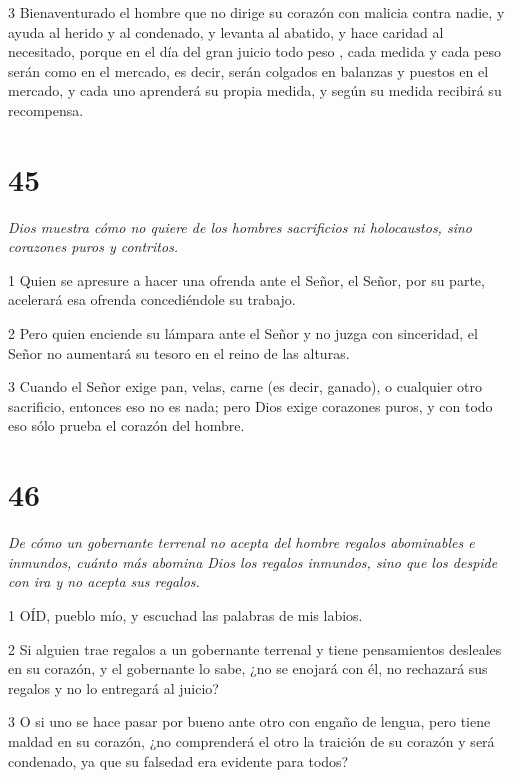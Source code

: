 \par 3 Bienaventurado el hombre que no dirige su corazón con malicia contra nadie, y ayuda al herido y al condenado, y levanta al abatido, y hace caridad al necesitado, porque en el día del gran juicio todo peso , cada medida y cada peso serán como en el mercado, es decir, serán colgados en balanzas y puestos en el mercado, y cada uno aprenderá su propia medida, y según su medida recibirá su recompensa.



\chapter{45}

\par \textit{Dios muestra cómo no quiere de los hombres sacrificios ni holocaustos, sino corazones puros y contritos.}

\par 1 Quien se apresure a hacer una ofrenda ante el Señor, el Señor, por su parte, acelerará esa ofrenda concediéndole su trabajo.

\par 2 Pero quien enciende su lámpara ante el Señor y no juzga con sinceridad, el Señor no aumentará su tesoro en el reino de las alturas.

\par 3 Cuando el Señor exige pan, velas, carne (es decir, ganado), o cualquier otro sacrificio, entonces eso no es nada; pero Dios exige corazones puros, y con todo eso sólo prueba el corazón del hombre.

\chapter{46}

\par \textit{De cómo un gobernante terrenal no acepta del hombre regalos abominables e inmundos, cuánto más abomina Dios los regalos inmundos, sino que los despide con ira y no acepta sus regalos.}

\par 1 OÍD, pueblo mío, y escuchad las palabras de mis labios.

\par 2 Si alguien trae regalos a un gobernante terrenal y tiene pensamientos desleales en su corazón, y el gobernante lo sabe, ¿no se enojará con él, no rechazará sus regalos y no lo entregará al juicio?

\par 3 O si uno se hace pasar por bueno ante otro con engaño de lengua, pero tiene maldad en su corazón, ¿no comprenderá el otro la traición de su corazón y será condenado, ya que su falsedad era evidente para todos?

